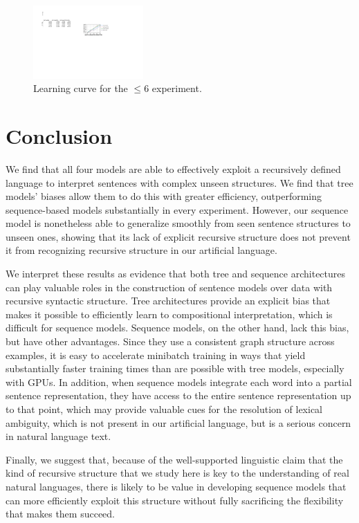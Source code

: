 \begin{figure}[t]
  \centering
      \includegraphics[height=1.1in]{lc.pdf}
  \caption{Learning curve for the $\le$6 experiment.}
  \label{fig:lc} 
\end{figure}


\section{Conclusion}

We find that all four models are able to effectively exploit a recursively defined language to interpret sentences with complex unseen structures.
We find that tree models' biases allow them to do this with greater efficiency, outperforming sequence-based models substantially in every experiment. However, our sequence model is nonetheless able to generalize smoothly from seen sentence structures to unseen ones, showing that its lack of explicit recursive structure does not prevent it from recognizing recursive structure in our artificial language.

We interpret these results as evidence that both tree and sequence architectures can play valuable roles in the construction of sentence models over data with recursive syntactic structure. Tree architectures provide an explicit bias that makes it possible to efficiently learn to compositional interpretation, which is difficult for sequence models. Sequence models, on the other hand, lack this bias, but have other advantages. Since they use a consistent graph structure across examples, it is easy to accelerate minibatch training in ways that yield substantially faster training times than are possible with tree models, especially with GPUs. In addition, when sequence models integrate each word into a partial sentence representation, they have access to the entire sentence representation up to that point, which may provide valuable cues for the resolution of lexical ambiguity, which is not present in our artificial language, but is a serious concern in natural language text.

Finally, we suggest that, because of the well-supported linguistic claim that the kind of recursive structure that we study here is key to the understanding of real natural languages, there is likely to be value in developing sequence models that can more efficiently exploit this structure without fully sacrificing the flexibility that makes them succeed.
